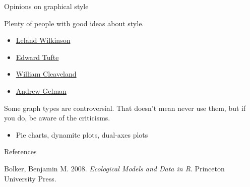 \documentclass[
  ignorenonframetext,
]{beamer}
\providecommand{\tightlist}{%
  \setlength{\itemsep}{0pt}\setlength{\parskip}{0pt}}
\begin{document}
\begin{frame}{Opinions on graphical style}
\protect\hypertarget{opinions-on-graphical-style}{}

Plenty of people with good ideas about style.

\begin{itemize}
\tightlist
\item
  \href{https://www.springer.com/gp/book/9780387245447}{Leland
  Wilkinson}
\item
  \href{https://www.edwardtufte.com/tufte/books_vdqi}{Edward Tufte}
\item
  \href{https://www.stat.purdue.edu/~wsc/}{William Cleaveland}
\item
  \href{http://www.stat.columbia.edu/~gelman/graphics.course/p755.pdf}{Andrew
  Gelman}
\end{itemize}

Some graph types are controversial. That doesn't mean never use them,
but if you do, be aware of the criticisms.

\begin{itemize}
\tightlist
\item
  Pie charts, dynamite plots, dual-axes plots
\end{itemize}

\end{frame}

\begin{frame}{References}
\protect\hypertarget{references}{}

\hypertarget{refs}{}
\leavevmode\hypertarget{ref-bolker}{}%
Bolker, Benjamin M. 2008. \emph{Ecological Models and Data in R}.
Princeton University Press.

\end{frame}
\end{document}

